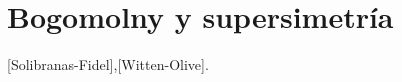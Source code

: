 
\chapter{Bogomolny y supersimetría} %

\label{ch:bogosusy} %


[Solibranas-Fidel],[Witten-Olive].


